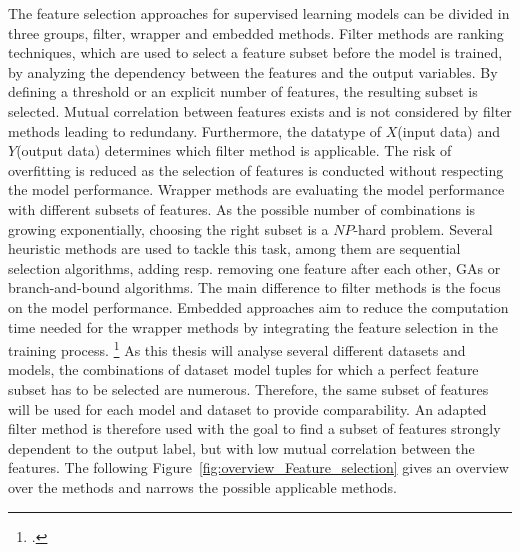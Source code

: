 The feature selection approaches for supervised learning models can be divided in three groups, filter, wrapper and embedded methods.
Filter methods are ranking techniques, which are used to select a feature subset before the model is trained, by analyzing
the dependency between the features and the output variables. By defining a threshold or an explicit number of features, the
resulting subset is selected. Mutual correlation between features exists and is not considered by filter methods
leading to redundany. Furthermore, the datatype of $X$(input data) and $Y$(output data) determines which filter method is applicable. The risk
of overfitting is reduced as the selection of features is conducted without respecting the model performance.
Wrapper methods are evaluating the model performance with different subsets of features. As the possible number of combinations is growing
exponentially, choosing the right subset is a $NP$-hard problem. Several heuristic methods are used to tackle this task, among them
are sequential selection algorithms, adding resp. removing one feature after each other,
\glspl{GA} or branch-and-bound algorithms. The main difference to filter methods is the focus on the model performance.
Embedded approaches aim to reduce the computation time needed for the wrapper methods by integrating the
feature selection in the training process. \footcites[cf.][pp.17-21]{chandrashekar_survey_2014} As this thesis will analyse several
different datasets and models, the combinations of dataset model tuples for which a perfect feature subset
has to be selected are numerous. Therefore, the same subset of features will be used for each model and dataset to provide comparability.
An adapted filter method is therefore used with the goal to find a subset of features strongly dependent
to the output label, but with low mutual correlation between the features. The following Figure~\ref{fig:overview_Feature_selection}
gives an overview over the methods and narrows the possible applicable methods.



